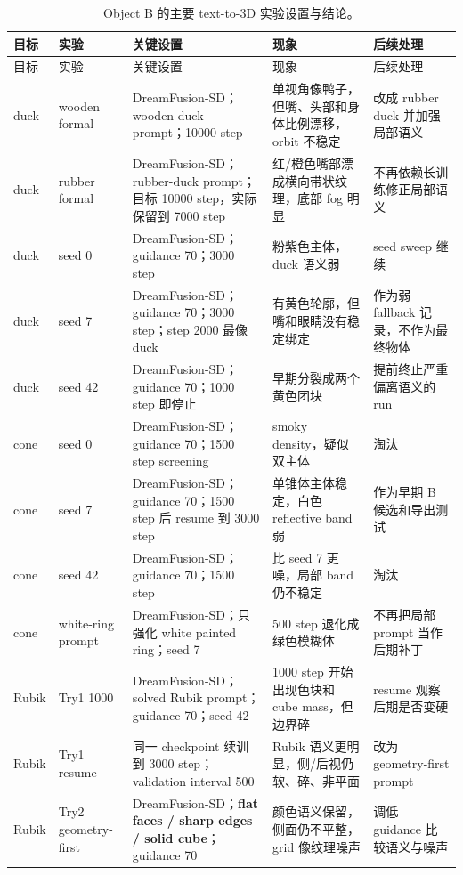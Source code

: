 \documentclass[UTF8,10pt,a4paper]{ctexart}
\begin{document}
\scriptsize
\begin{longtable}{p{} p{} p{} p{} p{}}
\caption{Object B 的主要 text-to-3D 实验设置与结论。}
\label{tab:object_b_settings}\\
\toprule
目标 & 实验 & 关键设置 & 现象 & 后续处理 \\
\midrule
\endfirsthead
\toprule
目标 & 实验 & 关键设置 & 现象 & 后续处理 \\
\midrule
\endhead
duck & wooden formal & DreamFusion-SD；wooden-duck prompt；10000 step & 单视角像鸭子，但嘴、头部和身体比例漂移，orbit 不稳定 & 改成 rubber duck 并加强局部语义 \\
duck & rubber formal & DreamFusion-SD；rubber-duck prompt；目标 10000 step，实际保留到 7000 step & 红/橙色嘴部漂成横向带状纹理，底部 fog 明显 & 不再依赖长训练修正局部语义 \\
duck & seed 0 & DreamFusion-SD；guidance 70；3000 step & 粉紫色主体，duck 语义弱 & seed sweep 继续 \\
duck & seed 7 & DreamFusion-SD；guidance 70；3000 step；step 2000 最像 duck & 有黄色轮廓，但嘴和眼睛没有稳定绑定 & 作为弱 fallback 记录，不作为最终物体 \\
duck & seed 42 & DreamFusion-SD；guidance 70；1000 step 即停止 & 早期分裂成两个黄色团块 & 提前终止严重偏离语义的 run \\
cone & seed 0 & DreamFusion-SD；guidance 70；1500 step screening & smoky density，疑似双主体 & 淘汰 \\
cone & seed 7 & DreamFusion-SD；guidance 70；1500 step 后 resume 到 3000 step & 单锥体主体稳定，白色 reflective band 弱 & 作为早期 B 候选和导出测试 \\
cone & seed 42 & DreamFusion-SD；guidance 70；1500 step & 比 seed 7 更噪，局部 band 仍不稳定 & 淘汰 \\
cone & white-ring prompt & DreamFusion-SD；只强化 white painted ring；seed 7 & 500 step 退化成绿色模糊体 & 不再把局部 prompt 当作后期补丁 \\
Rubik & Try1 1000 & DreamFusion-SD；solved Rubik prompt；guidance 70；seed 42 & 1000 step 开始出现色块和 cube mass，但边界碎 & resume 观察后期是否变硬 \\
Rubik & Try1 resume & 同一 checkpoint 续训到 3000 step；validation interval 500 & Rubik 语义更明显，侧/后视仍软、碎、非平面 & 改为 geometry-first prompt \\
Rubik & Try2 geometry-first & DreamFusion-SD；\textbf{flat faces / sharp edges / solid cube}；guidance 70 & 颜色语义保留，侧面仍不平整，grid 像纹理噪声 & 调低 guidance 比较语义与噪声 \\

\end{longtable}
\end{document}
